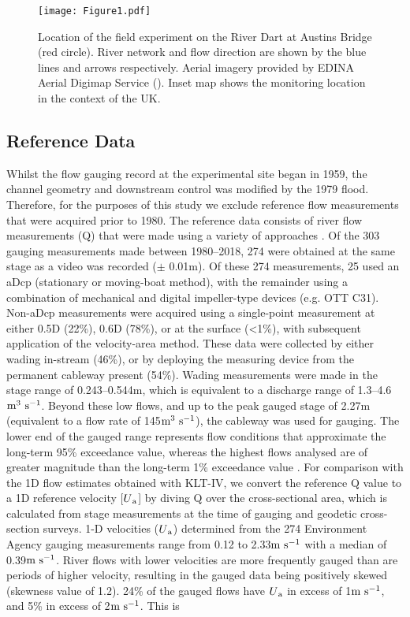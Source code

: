 \documentclass[hess, manuscript]{copernicus} %
\begin{document}
\begin{figure}[!htb]
\centering 
\texttt{[image: Figure1.pdf]}
\caption{Location of the field experiment on the River Dart at Austins Bridge (red circle). River network and flow direction are shown by the blue lines and arrows respectively. Aerial imagery provided by EDINA Aerial Digimap Service (\citeyear{EDINA2022}). Inset map shows the monitoring location in the context of the UK.}
\label{Figure1} 
\end{figure}


\subsection{Reference Data}
Whilst the flow gauging record at the experimental site began in 1959, the channel geometry and downstream control was modified by the 1979 flood. Therefore, for the purposes of this study we exclude reference flow measurements that were acquired prior to 1980. The reference data consists of river flow measurements (Q) that were made using a variety of approaches \citep{historic_flow}. Of the 303 gauging measurements made between 1980--2018, 274 were obtained at the same stage as a video was recorded ($\pm$ 0.01m). Of these 274 measurements, 25 used an aDcp (stationary or moving-boat method), with the remainder using a combination of mechanical and digital impeller-type devices (e.g. OTT C31). Non-aDcp measurements were acquired using a single-point measurement at either 0.5D (22\%), 0.6D (78\%), or at the surface (<1\%), with subsequent application of the velocity-area method. These data were collected by either wading in-stream (46\%), or by deploying the measuring device from the permanent cableway present (54\%). Wading measurements were made in the stage range of 0.243--0.544m, which is equivalent to a discharge range of 1.3--4.6 $\textnormal{m\textsuperscript{3} s\textsuperscript{-1}}$. Beyond these low flows, and up to the peak gauged stage of 2.27m (equivalent to a flow rate of 145$\textnormal{m\textsuperscript{3} s\textsuperscript{-1}}$), the cableway was used for gauging. The lower end of the gauged range represents flow conditions that approximate the long-term 95\% exceedance value, whereas the highest flows analysed are of greater magnitude than the long-term 1\% exceedance value \citep{ceh2024}. For comparison with the 1D flow estimates obtained with KLT-IV, we convert the reference Q value to a 1D reference velocity [$U\textsubscript{a}$] by diving Q over the cross-sectional area, which is calculated from stage measurements at the time of gauging and geodetic cross-section surveys. 1-D velocities ($U\textsubscript{a}$) determined from the 274 Environment Agency gauging measurements range from 0.12 to 2.33$\textnormal{m s\textsuperscript{-1}}$ with a median of 0.39$\textnormal{m s\textsuperscript{-1}}$. River flows with lower velocities are more frequently gauged than are periods of higher velocity, resulting in the gauged data being positively skewed (skewness value of 1.2). 24\% of the gauged flows have $U\textsubscript{a}$ in excess of 1$\textnormal{m s\textsuperscript{-1}}$, and 5\% in excess of 2$\textnormal{m s\textsuperscript{-1}}$. This is 
\end{document}

